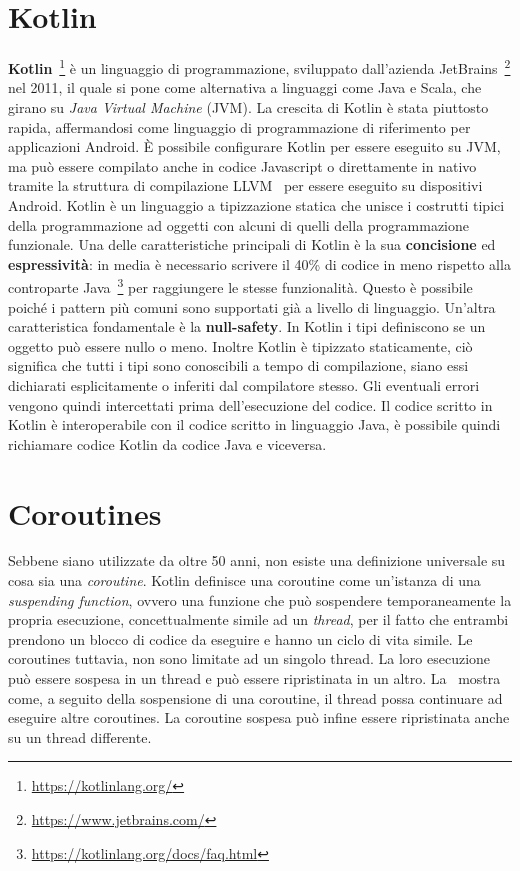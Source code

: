 \documentclass[12pt,a4paper,openright,twoside]{book}
\begin{document}
\section{Kotlin}
\textbf{Kotlin}~\footnote{\url{https://kotlinlang.org/}} è un linguaggio di programmazione, sviluppato dall'azienda JetBrains~\footnote{\url{https://www.jetbrains.com/}} nel 2011, il quale si pone come alternativa a linguaggi come Java e Scala, che girano su \textit{Java Virtual Machine} (JVM). La crescita di Kotlin è stata piuttosto rapida, affermandosi come linguaggio di programmazione di riferimento per applicazioni Android. 
È possibile configurare Kotlin per essere eseguito su JVM, ma può essere compilato anche in codice Javascript o direttamente in nativo tramite la struttura di compilazione LLVM~\cite{DBLP:conf/lcpc/LattnerA04} per essere eseguito su dispositivi Android. 
Kotlin è un linguaggio a tipizzazione statica che unisce i costrutti tipici della programmazione ad oggetti con alcuni di quelli della programmazione funzionale. 
Una delle caratteristiche principali di Kotlin è la sua \textbf{concisione} ed \textbf{espressività}: in media è necessario scrivere il 40\% di codice in meno rispetto alla controparte Java~\footnote{\url{https://kotlinlang.org/docs/faq.html}} per raggiungere le stesse funzionalità. Questo è possibile poiché i pattern più comuni sono supportati già a livello di linguaggio. 
Un'altra caratteristica fondamentale è la \textbf{null-safety}. In Kotlin i tipi definiscono se un oggetto può essere nullo o meno. Inoltre Kotlin è tipizzato staticamente, ciò significa che tutti i tipi sono conoscibili a tempo di compilazione, siano essi dichiarati esplicitamente o inferiti dal compilatore stesso. Gli eventuali errori vengono quindi intercettati prima dell'esecuzione del codice. 
Il codice scritto in Kotlin è interoperabile con il codice scritto in linguaggio Java, è possibile quindi richiamare codice Kotlin da codice Java e viceversa.

\section{Coroutines}
Sebbene siano utilizzate da oltre 50 anni, non esiste una definizione universale su cosa sia una \textit{coroutine}. 
Kotlin definisce una coroutine come un'istanza di una \textit{suspending function}, ovvero una funzione che può sospendere temporaneamente la propria esecuzione, concettualmente simile ad un \textit{thread}, per il fatto che entrambi prendono un blocco di codice da eseguire e hanno un ciclo di vita simile. Le coroutines tuttavia, non sono limitate ad un singolo thread. La loro esecuzione può essere sospesa in un thread e può essere ripristinata in un altro. La~ mostra come, a seguito della sospensione di una coroutine, il thread possa continuare ad eseguire altre coroutines. La coroutine sospesa può infine essere ripristinata anche su un thread differente.  
\end{document}
